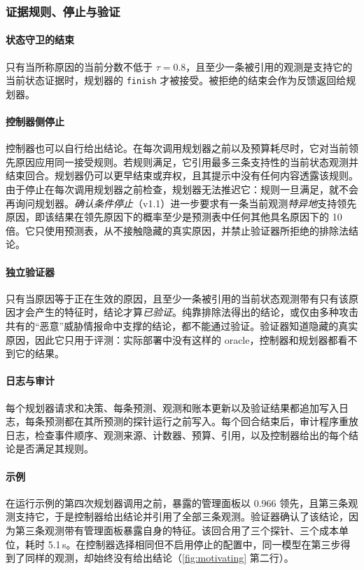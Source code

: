 \subsubsection{证据规则、停止与验证}
\label{sec:finish}
\paragraph{状态守卫的结束} 只有当所称原因的当前分数不低于 $\tau = 0.8$，且至少一条被引用的观测是支持它的当前状态证据时，规划器的 \texttt{finish} 才被接受。被拒绝的结束会作为反馈返回给规划器。

\paragraph{控制器侧停止} 控制器也可以自行给出结论。在每次调用规划器之前以及预算耗尽时，它对当前领先原因应用同一接受规则。若规则满足，它引用最多三条支持性的当前状态观测并结束回合。规划器仍可以更早结束或弃权，且其提示中没有任何内容透露该规则。由于停止在每次调用规划器之前检查，规划器无法推迟它：规则一旦满足，就不会再询问规划器。\emph{确认条件停止}（v1.1）进一步要求有一条当前观测\emph{特异地}支持领先原因，即该结果在领先原因下的概率至少是预测表中任何其他具名原因下的 10 倍。它只使用预测表，从不接触隐藏的真实原因，并禁止验证器所拒绝的排除法结论。

\paragraph{独立验证器} 只有当原因等于正在生效的原因，且至少一条被引用的当前状态观测带有只有该原因才会产生的特征时，结论才算\emph{已验证}。纯靠排除法得出的结论，或仅由多种攻击共有的“恶意”威胁情报命中支撑的结论，都不能通过验证。验证器知道隐藏的真实原因，因此它只用于评测：实际部署中没有这样的 oracle，控制器和规划器都看不到它的结果。

\paragraph{日志与审计} 每个规划器请求和决策、每条预测、观测和账本更新以及验证结果都追加写入日志，每条预测都在其所预测的探针运行之前写入。每个回合结束后，审计程序重放日志，检查事件顺序、观测来源、计数器、预算、引用，以及控制器给出的每个结论是否满足其规则。

\paragraph{示例} 在运行示例的第四次规划器调用之前，暴露的管理面板以 0.966 领先，且第三条观测支持它，于是控制器给出结论并引用了全部三条观测。验证器确认了该结论，因为第三条观测带有管理面板暴露自身的特征。该回合用了三个探针、三个成本单位，耗时 5.1\,s。在控制器选择相同但不启用停止的配置中，同一模型在第三步得到了同样的观测，却始终没有给出结论（\cref{fig:motivating} 第二行）。

